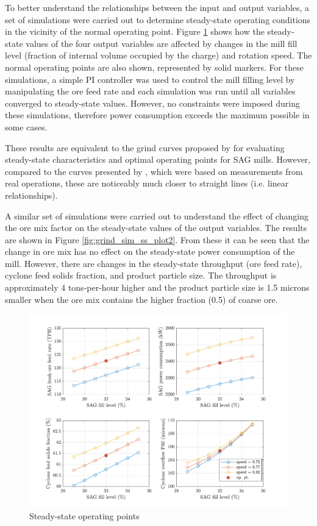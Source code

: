 {To better understand the relationships between the input and output variables, a set of simulations were carried out to determine steady-state operating conditions in the vicinity of the normal operating point. Figure \ref{fig:grind_sim_ss_plot1} shows how the steady-state values of the four output variables are affected by changes in the mill fill level (fraction of internal volume occupied by the charge) and rotation speed. The normal operating points are also shown, represented by solid markers. For these simulations, a simple PI controller was used to control the mill filling level by manipulating the ore feed rate and each simulation was run until all variables converged to steady-state values. However, no constraints were imposed during these simulations, therefore power consumption exceeds the maximum possible in some cases.

These results are equivalent to the grind curves proposed by \cite{powell_applying_2009} for evaluating steady-state characteristics and optimal operating points for SAG mills. However, compared to the curves presented by \cite{powell_applying_2009}, which were based on measurements from real operations, these are noticeably much closer to straight lines (i.e. linear relationships).

A similar set of simulations were carried out to understand the effect of changing the ore mix factor on the steady-state values of the output variables. The results are shown in Figure \ref{fig:grind_sim_ss_plot2}. From these it can be seen that the change in ore mix has no effect on the steady-state power consumption of the mill. However, there are changes in the steady-state throughput (ore feed rate), cyclone feed solids fraction, and product particle size. The throughput is approximately 4 tons-per-hour higher and the product particle size is 1.5 microns smaller when the ore mix contains the higher fraction (0.5) of coarse ore.

\begin{figure}[htp]
	\centering
	\includegraphics[width=15cm]{images/grind_sim_ss_plot1.pdf}
	\caption{Steady-state operating points}
	\label{fig:grind_sim_ss_plot1}
\end{figure}

}
